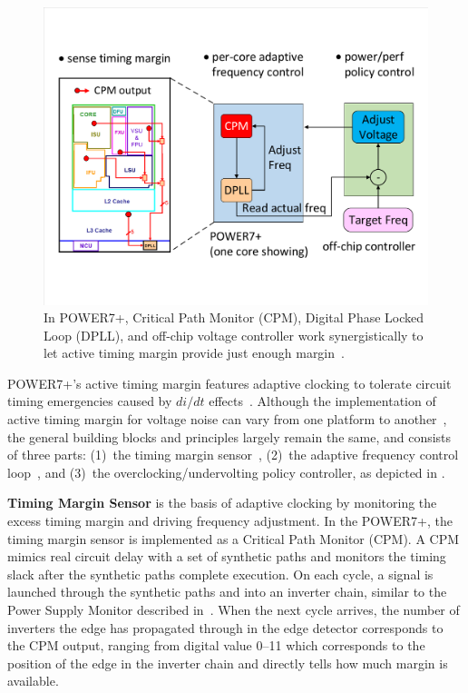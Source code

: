 \begin{figure}[t]
  \centering
  \includegraphics[trim=20 80 20 80,clip,width=0.8\linewidth]{graphs/process//atm-loop.pdf}
  \caption{In POWER7+, Critical Path Monitor (CPM), Digital Phase Locked Loop (DPLL), and off-chip voltage controller work synergistically to let active timing margin provide just enough margin~\cite{lefurgy2013active}.}
  \label{fig:active-margin-loop}
\end{figure}

POWER7+'s active timing margin features adaptive clocking to tolerate circuit timing emergencies caused by $di/dt$ effects~\cite{lefurgy2011active,lefurgy2013active,floyd2013runtime}. Although the implementation of active timing margin for voltage noise can vary from one platform to another~\cite{fischer200590nm,tschanz2007adaptive,kurd2008next,lefurgy2011active,bowman201222nm,grenat20145,tokunaga20145,bowman20158}, the general building blocks and principles largely remain the same, and consists of three parts: (1)~the timing margin sensor~\cite{drake2007distributed,drake2013single}, (2)~the adaptive frequency control loop~\cite{tierno2010dpll}, and (3)~the overclocking/undervolting policy controller, as depicted in .

\textbf{Timing Margin Sensor} is the basis of adaptive clocking by monitoring the excess timing margin and driving frequency adjustment. In the POWER7+, the timing margin sensor is implemented as a Critical Path Monitor (CPM). A CPM mimics real circuit delay with a set of synthetic paths and monitors the timing slack after the synthetic paths complete execution. On each cycle, a signal is launched through the synthetic paths and into an inverter chain, similar to the Power Supply Monitor described in~. When the next cycle arrives, the number of inverters the edge has propagated through in the edge detector corresponds to the CPM output, ranging from digital value 0--11 which corresponds to the position of the edge in the inverter chain and directly tells how much margin is available.

